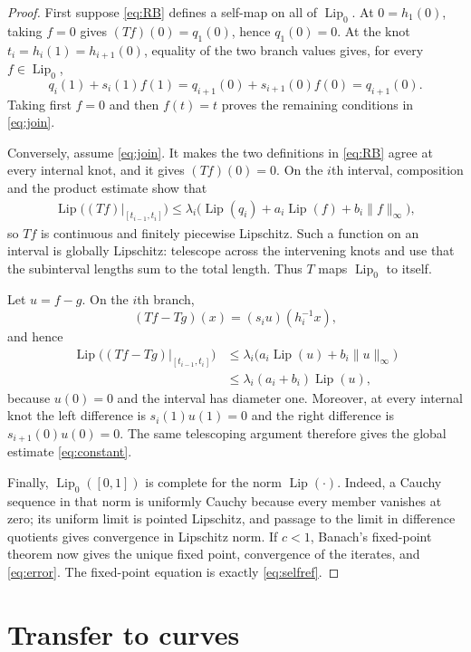 \documentclass[11pt]{article}
\newcommand{\Lip}{\operatorname{Lip}}
\newcommand{\Lipz}{\operatorname{Lip}_0}
\begin{document}
\begin{proof}
First suppose \eqref{eq:RB} defines a self-map on all of $\Lipz$.
At $0=h_1(0)$, taking $f=0$ gives $(Tf)(0)=q_1(0)$, hence
$q_1(0)=0$.  At the knot $t_i=h_i(1)=h_{i+1}(0)$, equality of the two
branch values gives, for every $f\in\Lipz$,
\[
 q_i(1)+s_i(1)f(1)=q_{i+1}(0)+s_{i+1}(0)f(0)=q_{i+1}(0).
\]
Taking first $f=0$ and then $f(t)=t$ proves the remaining conditions in
\eqref{eq:join}.

Conversely, assume \eqref{eq:join}.  It makes the two definitions in
\eqref{eq:RB} agree at every internal knot, and it gives $(Tf)(0)=0$.
On the $i$th interval, composition and the product estimate show that
\begin{align*}
 \Lip\big((Tf)|_{[t_{i-1},t_i]}\big)
 \leq \lambda_i\big(
   \Lip(q_i)+a_i\Lip(f)+b_i\|f\|_\infty
 \big),
\end{align*}
so $Tf$ is continuous and finitely piecewise Lipschitz.  Such a function on
an interval is globally Lipschitz: telescope across the intervening knots and
use that the subinterval lengths sum to the total length.  Thus $T$ maps
$\Lipz$ to itself.

Let $u=f-g$.  On the $i$th branch,
\[
 (Tf-Tg)(x)=(s_i u)(h_i^{-1}x),
\]
and hence
\begin{align*}
 \Lip\big((Tf-Tg)|_{[t_{i-1},t_i]}\big)
 &\leq\lambda_i\big(a_i\Lip(u)+b_i\|u\|_\infty\big)\\
 &\leq\lambda_i(a_i+b_i)\Lip(u),
\end{align*}
because $u(0)=0$ and the interval has diameter one.  Moreover, at every
internal knot the left difference is $s_i(1)u(1)=0$ and the right difference
is $s_{i+1}(0)u(0)=0$.  The same telescoping argument therefore gives the
global estimate \eqref{eq:constant}.

Finally, $\Lipz([0,1])$ is complete for the norm $\Lip(\cdot)$.  Indeed, a
Cauchy sequence in that norm is uniformly Cauchy because every member
vanishes at zero; its uniform limit is pointed Lipschitz, and passage to the
limit in difference quotients gives convergence in Lipschitz norm.  If $c<1$,
Banach's fixed-point theorem now gives the unique fixed point, convergence of
the iterates, and \eqref{eq:error}.  The fixed-point equation is exactly
\eqref{eq:selfref}.
\end{proof}

\section*{Transfer to curves}
\end{document}
